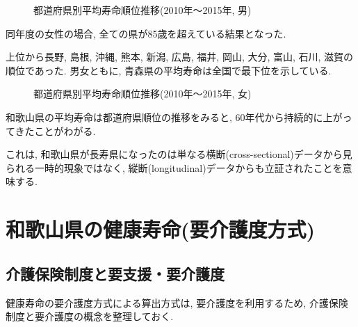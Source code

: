 \begin{figure}[h!]
	\begin{center}
		\caption{都道府県別平均寿命順位推移(2010年〜2015年, 男)}
	\end{center}
\end{figure}


同年度の女性の場合, 全ての県が85歳を超えている結果となった.

上位から長野, 島根, 沖縄, 熊本, 新潟, 広島, 福井, 岡山, 大分, 富山, 石川, 滋賀の順位であった.
男女ともに, 青森県の平均寿命は全国で最下位を示している.
\begin{figure}[h!]
	\begin{center}
		\caption{都道府県別平均寿命順位推移(2010年〜2015年, 女)}\end{center}
\end{figure}






和歌山県の平均寿命は都道府県順位の推移をみると,
60年代から持続的に上がってきたことがわがる.

これは, 和歌山県が長寿県になったのは単なる横断(cross-sectional)データから見られる一時的現象ではなく, 縦断(longitudinal)データからも立証されたことを意味する.


\section{和歌山県の健康寿命(要介護度方式)}
\subsection{介護保険制度と要支援・要介護度}
健康寿命の要介護度方式による算出方式は, 要介護度を利用するため, 介護保険制度と要介護度の概念を整理しておく.

